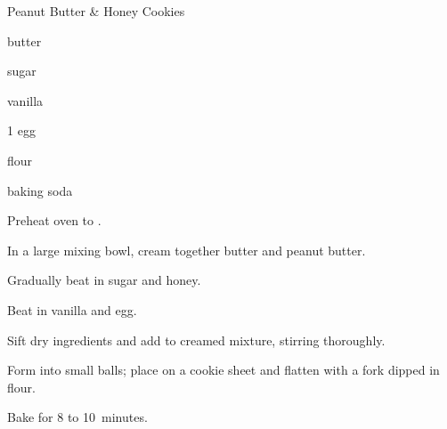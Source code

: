 \begin{recipe}{Peanut Butter \& Honey Cookies}{}{}

\begin{ingredients}
\item \C{\half} butter
\item \C{\third} 
\item \C{\half} sugar
\item \C{\third} 
\item {} vanilla
\item 1 egg
\item \C{1 \half} flour
\item {} baking soda
\end{ingredients}

\begin{directions}
\item Preheat oven to .
\item In a large mixing bowl, cream together butter and peanut butter.
\item Gradually beat in sugar and honey.
\item Beat in vanilla and egg.
\item Sift dry ingredients and add to creamed mixture, stirring thoroughly.
\item Form into small balls; place on a cookie sheet and flatten with a fork dipped in flour.
\item Bake for 8 to 10~minutes.
\end{directions}
\end{recipe}
